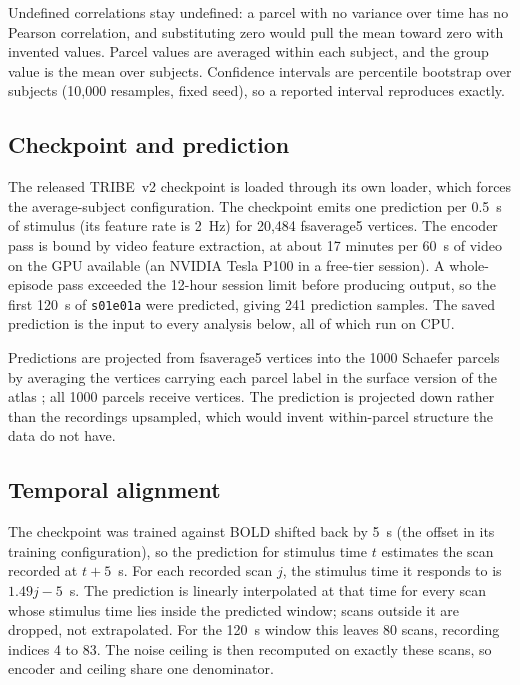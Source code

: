 \documentclass[preprint,12pt]{elsarticle}
\begin{document}
Undefined correlations stay undefined: a parcel with no variance over time has no Pearson
correlation, and substituting zero would pull the mean toward zero with invented values.
Parcel values are averaged within each subject, and the group value is the mean over
subjects. Confidence intervals are percentile bootstrap over subjects (10,000 resamples,
fixed seed), so a reported interval reproduces exactly.

\subsection{Checkpoint and prediction}

The released TRIBE~v2 checkpoint \cite{tribev2} is loaded through its own loader, which forces
the average-subject configuration. The checkpoint emits one prediction per 0.5~s of stimulus
(its feature rate is 2~Hz) for 20,484 fsaverage5 vertices. The encoder pass is bound by video
feature extraction, at about 17 minutes per 60~s of video on the GPU available (an NVIDIA
Tesla P100 in a free-tier session). A whole-episode pass exceeded the 12-hour session limit
before producing output, so the first 120~s of \texttt{s01e01a} were predicted, giving 241
prediction samples. The saved prediction is the input to every analysis below, all of which
run on CPU.

Predictions are projected from fsaverage5 vertices into the 1000 Schaefer parcels by averaging
the vertices carrying each parcel label in the surface version of the atlas
\cite{schaefer2018}; all 1000 parcels receive vertices. The prediction is projected down
rather than the recordings upsampled, which would invent within-parcel structure the data do
not have.

\subsection{Temporal alignment}
\label{sec:alignment}

The checkpoint was trained against BOLD shifted back by 5~s (the offset in its training
configuration), so the prediction for stimulus time $t$ estimates the scan recorded at
$t + 5$~s. For each recorded scan $j$, the stimulus time it responds to is $1.49j - 5$~s. The
prediction is linearly interpolated at that time for every scan whose stimulus time lies
inside the predicted window; scans outside it are dropped, not extrapolated. For the 120~s
window this leaves 80 scans, recording indices 4 to 83. The noise ceiling is then recomputed on
exactly these scans, so encoder and ceiling share one denominator.
\end{document}
